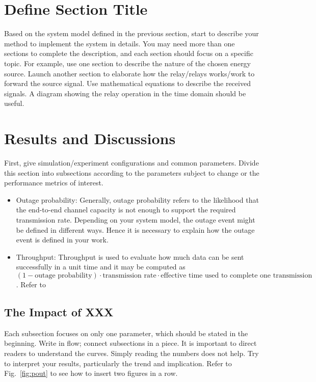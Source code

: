 \documentclass[11pt,a4paper]{scrartcl}
\begin{document}
\section{Define Section Title}\label{sec:main}
Based on the system model defined in the previous section, start to describe your method to implement the system in details. You may need more than one sections to complete the description, and each section should focus on a specific topic. For example, use one section to describe the nature of the chosen energy source. Launch another section to elaborate how the relay/relays works/work to forward the source signal. Use mathematical equations to describe
the received signals. A diagram showing the relay operation in the time domain should be useful.

\section{Results and Discussions}\label{sec:results}
First, give simulation/experiment configurations and common parameters. Divide this section into subsections according to the parameters subject to change or the performance metrics of interest. 
\begin{itemize}
\item Outage probability: Generally, outage probability refers to the likelihood that the end-to-end channel capacity is not enough to support the required transmission rate. Depending on your system model, the outage event might be defined in different ways. Hence it is necessary to explain how the
outage event is defined in your work. 
\item Throughput: Throughput is used to evaluate how much data can be sent successfully in a unit time and it may be computed as $(1-\text{outage probability})\cdot \text{transmission rate} \cdot \text{effective time used to complete one transmission}$. Refer to~\cite[Eq.~(14)]{Nasir2013}
\end{itemize}

\subsection{The Impact of XXX}
Each subsection focuses on only one parameter, which should be stated in the beginning. Write in flow; connect subsections in a piece. It is important to direct readers to understand the curves. Simply reading the numbers does not help. Try to interpret your results, particularly the trend and implication. Refer to Fig.~\ref{fig:pout} to see how to insert two figures in a row.
\end{document}

